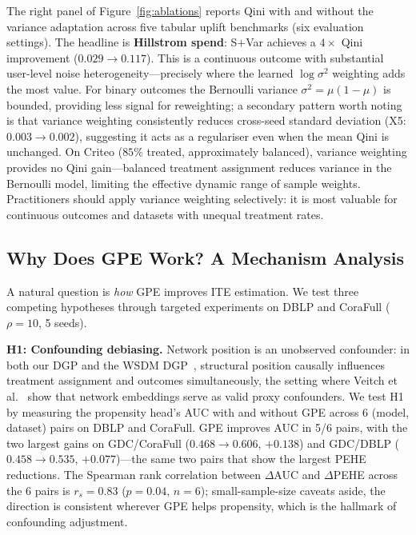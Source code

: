 \documentclass[sigconf,anonymous,review]{acmart}
\begin{document}
The right panel of Figure~\ref{fig:ablations} reports Qini with and without the variance adaptation across five tabular uplift benchmarks (six evaluation settings). The headline is \textbf{Hillstrom spend}: S$+$Var achieves a $4{\times}$ Qini improvement ($0.029{\to}0.117$). This is a continuous outcome with substantial user-level noise heterogeneity---precisely where the learned $\log\sigma^2$ weighting adds the most value. For binary outcomes the Bernoulli variance $\sigma^2{=}\mu(1{-}\mu)$ is bounded, providing less signal for reweighting; a secondary pattern worth noting is that variance weighting consistently reduces cross-seed standard deviation (X5: $0.003{\to}0.002$), suggesting it acts as a regulariser even when the mean Qini is unchanged. On Criteo ($85\%$ treated, approximately balanced), variance weighting provides no Qini gain---balanced treatment assignment reduces variance in the Bernoulli model, limiting the effective dynamic range of sample weights. Practitioners should apply variance weighting selectively: it is most valuable for continuous outcomes and datasets with unequal treatment rates.

\subsection{Why Does GPE Work? A Mechanism Analysis}\label{sec:mechanism}

A natural question is \emph{how} GPE improves ITE estimation. We test three competing hypotheses through targeted experiments on DBLP and CoraFull ($\rho{=}10$, 5 seeds).

\textbf{H1: Confounding debiasing.} Network position is an unobserved confounder: in both our DGP and the WSDM DGP~\cite{guo2020learning}, structural position causally influences treatment assignment and outcomes simultaneously, the setting where Veitch et al.~\cite{veitch2019using} show that network embeddings serve as valid proxy confounders. We test H1 by measuring the propensity head's AUC with and without GPE across 6 (model, dataset) pairs on DBLP and CoraFull. GPE improves AUC in 5/6 pairs, with the two largest gains on GDC/CoraFull ($0.468\to0.606$, $+0.138$) and GDC/DBLP ($0.458\to0.535$, $+0.077$)---the same two pairs that show the largest PEHE reductions. The Spearman rank correlation between $\Delta$AUC and $\Delta$PEHE across the 6 pairs is $r_s{=}0.83$ ($p{=}0.04$, $n{=}6$); small-sample-size caveats aside, the direction is consistent wherever GPE helps propensity, which is the hallmark of confounding adjustment.
\end{document}
